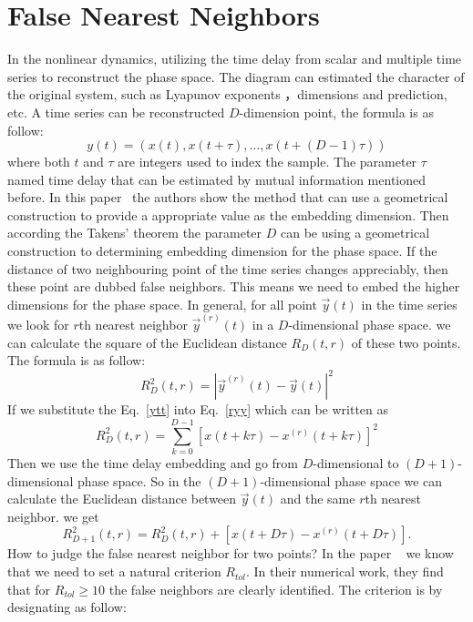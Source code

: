 \documentclass[conference]{IEEEtran}
\begin{document}
 \section{False Nearest Neighbors}
 In the nonlinear dynamics, utilizing the time delay from scalar and multiple time series to reconstruct the phase space. The diagram can estimated the character of the original system, such as Lyapunov exponents ，dimensions and prediction, etc.  A time series can be reconstructed $D$-dimension point, the formula is as follow:
 \begin{equation}\label{ytt}
     y(t) = (x(t),x(t+\tau),\dots, x(t+(D-1)\tau))
 \end{equation}
 where both $t$ and $\tau$ are integers used to index the sample. The parameter $\tau$ named time delay that can be estimated by mutual information mentioned before. In this paper~\cite{ed1992a} the authors show the method that can use a geometrical construction to provide a appropriate value as the embedding dimension. Then according the Takens' theorem the parameter $D$ can be using a geometrical construction to determining embedding dimension for the phase space. If the distance of two neighbouring point of the time series changes appreciably, then these point are dubbed false neighbors. This means we need to embed the higher dimensions for the phase space. In general, for all point $\vec{y}(t)$ in the time series  we look for $r$th nearest neighbor $\vec{y}^{(r)}(t)$ in a $D$-dimensional phase space. we can calculate the square of the Euclidean distance $R_D(t,r)$ of these two points. The formula is as follow:
 \begin{equation}\label{ryy}
     R^2_D(t,r) = \left|\vec{y}^{(r)}(t) - \vec{y}(t)\right|^2
 \end{equation}
 If we substitute the Eq.~\eqref{ytt} into Eq.~\eqref{ryy} which can be written as
 \begin{equation}
     R^2_D(t,r) = \sum_{k=0}^{D-1}\left[x(t+k\tau)-x^{(r)}(t+k\tau)\right]^2
 \end{equation}
 Then we use the time delay embedding and go from $D$-dimensional to $(D+1)$-dimensional phase space. So in the $(D+1)$-dimensional phase space we can calculate the Euclidean distance between $\vec{y}(t)$ and the same $r$th nearest neighbor. we get 
 \begin{equation}
     R^2_{D+1}(t,r) = R^2_D(t,r) + \left[x(t+D\tau)-x^{(r)}(t+D\tau)\right].
 \end{equation}
 How to judge the false nearest neighbor for two points? In the paper ~\cite{} we know that we need to set a natural criterion $R_{tol}$. In their numerical work, they find that for $R_{tol} \geq 10$ the false neighbors are clearly identified. The criterion is by designating as follow:
\end{document}
